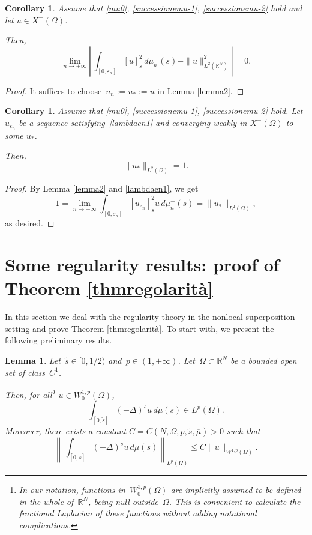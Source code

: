 \documentclass[12pt,a4paper,intlimits,sumlimits]{amsart}
\def \R {\mathbb{R}}
\theoremstyle{definition}
\theoremstyle{plain}
\newtheorem{lemma}[definition]{Lemma}
\newtheorem{corollary}[definition]{Corollary}
\numberwithin{equation}{section}
\renewcommand{\leq}{\leqslant}
\begin{document}
\begin{corollary}\label{lemma1}
Assume that \eqref{mu0}, \eqref{successionemu-1}, \eqref{successionemu-2} hold and let $u\in X^+(\Omega)$. 

Then,
\begin{equation}\label{limitemu-n}
\lim_{n\to +\infty}\left|\,\int_{[0, \varepsilon_n]} [u]^2_s\, d\mu^-_n(s) - \|u\|^2_{L^2(\R^N)} \right| = 0.
\end{equation}
\end{corollary}

\begin{proof} It suffices to choose~$u_n:=u_*:=u$
in Lemma \ref{lemma2}.
\end{proof}

\begin{corollary}\label{cor=1}
Assume that \eqref{mu0}, \eqref{successionemu-1}, \eqref{successionemu-2} hold. Let $u_{\varepsilon_n}$ be a sequence satisfying~\eqref{lambdaen1}
and converging weakly in $X^+(\Omega)$ to some $u_*$.

Then, 
\[
\|u_*\|_{L^2(\Omega)} =1.
\]
\end{corollary}
\begin{proof}
By Lemma \ref{lemma2} and \eqref{lambdaen1}, we get
\[
1= \lim_{n\to +\infty}\int_{[0, \varepsilon_n]} [u_{\varepsilon_n}]^2_s u\, d\mu^-_n(s) = \|u_*\|_{L^2(\Omega)},
\]
as desired.
\end{proof}

\section{Some regularity results: proof of Theorem  \ref{thmregolarità}}\label{oajdcfwe9rtm92-34v50nVGm504r023902}
In this section we deal with the regularity theory in the nonlocal superposition setting and prove Theorem \ref{thmregolarità}.
To start with, we present the following preliminary results.

\begin{lemma}\label{misurainLp}
Let~$\widetilde s\in[0,1/2)$
and~$p\in(1,+\infty)$.
Let~$\Omega\subset\R^N$ be a bounded open set of class~$C^1$.

Then, for all\footnote{In our notation, functions
in~$W^{1,p}_0(\Omega)$ are implicitly assumed to be defined
in the whole of~$\R^N$, being null outside~$\Omega$. This is convenient to calculate the fractional Laplacian of these functions
without adding notational complications.} $u\in W^{1,p}_0(\Omega)$,
\[
\int_{[0,\widetilde s]}(-\Delta)^s u\,d\mu(s)\in L^p(\Omega).
\]
Moreover,  there exists a constant $C=C(N,\Omega,p,\widetilde s,\overline\mu)>0$ such that
\[
\left\|\,\int_{[0,\widetilde s]}(-\Delta)^s u\,d\mu(s) \right\|_{L^p(\Omega)}\leq C\|u\|_{W^{1,p}(\Omega)}.
\]
\end{lemma}
\end{document}
